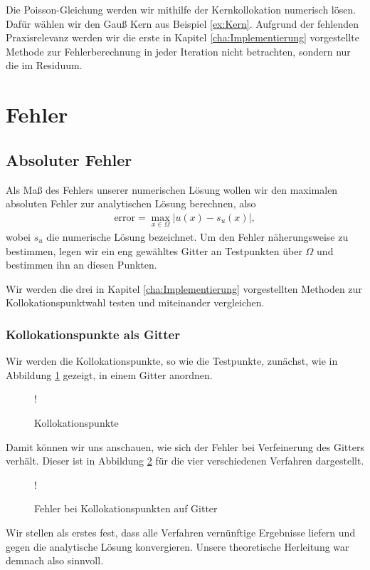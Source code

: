 Die Poisson-Gleichung werden wir mithilfe der Kernkollokation numerisch lösen. Dafür wählen wir den Gauß Kern aus Beispiel \ref{ex:Kern}. Aufgrund der fehlenden Praxisrelevanz werden wir die erste in Kapitel \ref{cha:Implementierung} vorgestellte Methode zur Fehlerberechnung in jeder Iteration nicht betrachten, sondern nur die im Residuum.

\section{Fehler}
\subsection{Absoluter Fehler}

Als Maß des Fehlers unserer numerischen Lösung wollen wir den maximalen absoluten Fehler zur analytischen Lösung berechnen, also
\begin{align*}
\text{error} = \max_{x \in \Omega} |u(x) - s_u (x)|,
\end{align*}
wobei $s_u$ die numerische Lösung bezeichnet. Um den Fehler näherungsweise zu bestimmen, legen wir ein eng gewähltes Gitter an Testpunkten über $\Omega$ und bestimmen ihn an diesen Punkten.

Wir werden die drei in Kapitel \ref{cha:Implementierung} vorgestellten Methoden zur Kollokationspunktwahl testen und miteinander vergleichen. 
\subsubsection{Kollokationspunkte als Gitter}
Wir werden die Kollokationspunkte, so wie die Testpunkte, zunächst, wie in Abbildung \ref{fig:Kollok} gezeigt, in einem Gitter anordnen.
\begin{figure}[ht]
\centering
\resizebox {.8\columnwidth} {!} {

}
\caption{Kollokationspunkte}
\label{fig:Kollok}
\end{figure}

Damit können wir uns anschauen, wie sich der Fehler bei Verfeinerung des Gitters verhält. Dieser ist in Abbildung \ref{fig:error} für die vier verschiedenen Verfahren dargestellt. 
\begin{figure}[ht]
\centering
\resizebox {\columnwidth} {!} {

}
\caption{Fehler bei Kollokationspunkten auf Gitter}
\label{fig:error}
\end{figure}

Wir stellen als erstes fest, dass alle Verfahren vernünftige Ergebnisse liefern und gegen die analytische Lösung konvergieren. Unsere theoretische Herleitung war demnach also sinnvoll. 

